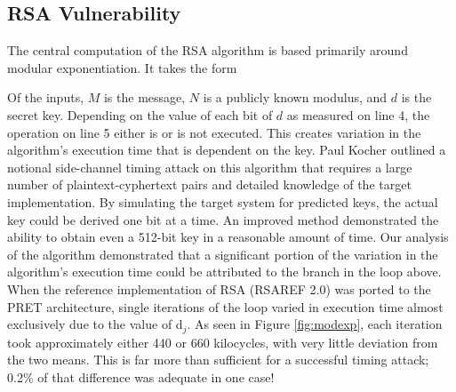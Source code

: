 \documentclass[times, 10pt,twocolumn]{article}
\begin{document}
\subsection{RSA Vulnerability}
The central computation of the RSA algorithm is based primarily around modular exponentiation.  It takes the form 

\begin{center}\end{center}

Of the inputs, $M$ is the message, $N$ is a publicly known modulus, and $d$ is the secret key.  Depending on the value of each bit of $d$ as measured on line 4, the operation on line 5 either is or is not executed.  This creates variation in the algorithm's execution time that is dependent on the key.  Paul Kocher outlined\cite{Kocher96timingattacks} a notional side-channel timing attack on this algorithm that requires a large number of plaintext-cyphertext pairs and detailed knowledge of the target implementation.  By simulating the target system for predicted keys, the actual key could be derived one bit at a time.  An improved method \cite{DKLMQW98} demonstrated the ability to obtain even a 512-bit key in a reasonable amount of time.  Our analysis of the algorithm demonstrated that a significant portion of the variation in the algorithm's execution time could be attributed to the branch in the loop above.  When the reference implementation of RSA (RSAREF 2.0) was ported to the PRET architecture, single iterations of the loop varied in execution time almost exclusively due to the value of d$_{j}$.  As seen in Figure \ref{fig:modexp}, each iteration took approximately either 440 or 660 kilocycles, with very little deviation from the two means.  This is far more than sufficient for a successful timing attack; 0.2\% of that difference was adequate in one case! \cite{DKLMQW98}
\end{document}
